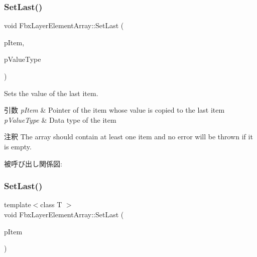 \mbox{\label{class_fbx_layer_element_array_a05706c8479fb3d84325a41464d7fa9dd}} 
\subsubsection{\texorpdfstring{Set\+Last()}{SetLast()}\hspace{0.1cm}{\footnotesize\ttfamily [1/2]}}
{\footnotesize\ttfamily void Fbx\+Layer\+Element\+Array\+::\+Set\+Last (\begin{DoxyParamCaption}\item[{const void $\ast$}]{p\+Item,  }\item[{\hyperlink{fbxpropertytypes_8h_a73913a5ddfb20e57c6f25e9e6784bd92}{E\+Fbx\+Type}}]{p\+Value\+Type }\end{DoxyParamCaption})}

Sets the value of the last item. 
\begin{DoxyParams}{引数}
{\em p\+Item} & Pointer of the item whose value is copied to the last item \\
\hline
{\em p\+Value\+Type} & Data type of the item \\
\hline
\end{DoxyParams}
\begin{DoxyRemark}{注釈}
The array should contain at least one item and no error will be thrown if it is empty. 
\end{DoxyRemark}
被呼び出し関係図\+:
\mbox{\label{class_fbx_layer_element_array_aebc103a4f95690e6aef3961b6198df3d}} 
\subsubsection{\texorpdfstring{Set\+Last()}{SetLast()}\hspace{0.1cm}{\footnotesize\ttfamily [2/2]}}
{\footnotesize\ttfamily template$<$class T $>$ \\
void Fbx\+Layer\+Element\+Array\+::\+Set\+Last (\begin{DoxyParamCaption}\item[{T const \&}]{p\+Item }\end{DoxyParamCaption})}

